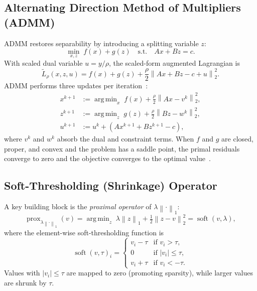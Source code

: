 \documentclass[journal,twoside,10pt]{IEEEtran}
\DeclareMathOperator*{\argmin}{arg\,min}
\newcommand{\norm}[1]{\left\lVert#1\right\rVert}
\begin{document}
\subsection{Alternating Direction Method of Multipliers (ADMM)}
\label{ssec:admm}

ADMM restores separability by introducing a splitting variable $z$:
\begin{equation}
  \min_{x,z}\; f(x)+g(z) \quad\text{s.t.}\quad Ax+Bz=c.
  \label{eq:admm_prob}
\end{equation}
With scaled dual variable $u=y/\rho$, the scaled-form augmented Lagrangian is
\begin{equation}
  \widetilde{L}_\rho(x,z,u) = f(x)+g(z)+\frac{\rho}{2}\norm{Ax+Bz-c+u}_2^2.
\end{equation}
ADMM performs three updates per iteration~\cite{boyd2011,gabay1976}:
\begin{align}
  x^{k+1} &:= \argmin_x\; f(x)+\tfrac{\rho}{2}\norm{Ax-v^k}_2^2, \label{eq:admm_x_gen}\\
  z^{k+1} &:= \argmin_z\; g(z)+\tfrac{\rho}{2}\norm{Bz-w^k}_2^2, \label{eq:admm_z_gen}\\
  u^{k+1} &:= u^k + (Ax^{k+1}+Bz^{k+1}-c), \label{eq:admm_u_gen}
\end{align}
where $v^k$ and $w^k$ absorb the dual and constraint terms.  When $f$ and $g$ are closed, proper, and
convex and the problem has a saddle point, the primal residuals converge to zero and the objective
converges to the optimal value~\cite{boyd2011,eckstein1992}.

\subsection{Soft-Thresholding (Shrinkage) Operator}
\label{ssec:soft}

A key building block is the \emph{proximal operator} of $\lambda\norm{\cdot}_1$:
\begin{equation}
  \operatorname{prox}_{\lambda\norm{\cdot}_1}(v)
  = \argmin_z\;\lambda\norm{z}_1 + \tfrac{1}{2}\norm{z-v}_2^2
  = \operatorname{soft}(v,\lambda),
\end{equation}
where the element-wise soft-thresholding function is
\begin{equation}
  \operatorname{soft}(v,\tau)_i =
  \begin{cases}
    v_i - \tau & \text{if } v_i > \tau,\\
    0           & \text{if } |v_i| \le \tau,\\
    v_i + \tau & \text{if } v_i < -\tau.
  \end{cases}
  \label{eq:soft}
\end{equation}
Values with $|v_i|\le\tau$ are mapped to zero (promoting sparsity), while larger values are shrunk by $\tau$.
\end{document}
